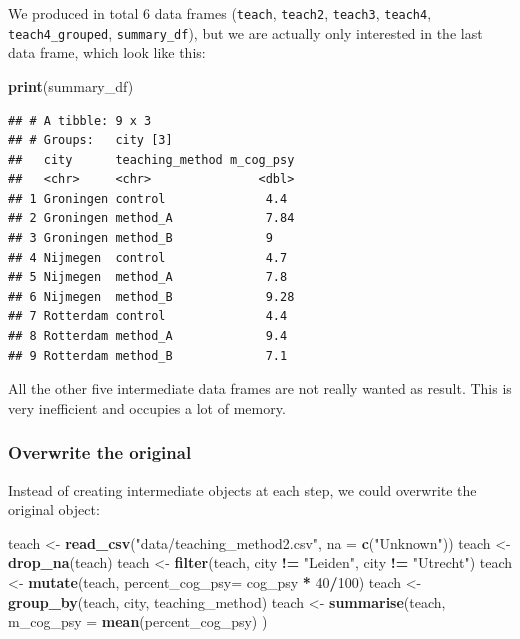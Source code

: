 \documentclass[
]{scrartcl}
\newenvironment{Shaded}{\begin{snugshade}}{\end{snugshade}}
\newcommand{\AttributeTok}[1]{\textcolor[rgb]{0.13,0.29,0.53}{#1}}
\newcommand{\DecValTok}[1]{\textcolor[rgb]{0.00,0.00,0.81}{#1}}
\newcommand{\FunctionTok}[1]{\textcolor[rgb]{0.13,0.29,0.53}{\textbf{#1}}}
\newcommand{\NormalTok}[1]{#1}
\newcommand{\OtherTok}[1]{\textcolor[rgb]{0.56,0.35,0.01}{#1}}
\newcommand{\SpecialCharTok}[1]{\textcolor[rgb]{0.81,0.36,0.00}{\textbf{#1}}}
\newcommand{\StringTok}[1]{\textcolor[rgb]{0.31,0.60,0.02}{#1}}
\begin{document}
We produced in total 6 data frames (\texttt{teach}, \texttt{teach2}, \texttt{teach3}, \texttt{teach4}, \texttt{teach4\_grouped}, \texttt{summary\_df}), but we are actually only interested in the last data frame, which look like this:

\begin{Shaded}
\begin{Highlighting}[]
\FunctionTok{print}\NormalTok{(summary\_df)}
\end{Highlighting}
\end{Shaded}

\begin{verbatim}
## # A tibble: 9 x 3
## # Groups:   city [3]
##   city      teaching_method m_cog_psy
##   <chr>     <chr>               <dbl>
## 1 Groningen control              4.4 
## 2 Groningen method_A             7.84
## 3 Groningen method_B             9   
## 4 Nijmegen  control              4.7 
## 5 Nijmegen  method_A             7.8 
## 6 Nijmegen  method_B             9.28
## 7 Rotterdam control              4.4 
## 8 Rotterdam method_A             9.4 
## 9 Rotterdam method_B             7.1
\end{verbatim}

All the other five intermediate data frames are not really wanted as result. This is very inefficient and occupies a lot of memory.

\hypertarget{overwrite-the-original}{%
\subsubsection{Overwrite the original}\label{overwrite-the-original}}

Instead of creating intermediate objects at each step, we could overwrite the original object:

\begin{Shaded}
\begin{Highlighting}[]
\NormalTok{teach }\OtherTok{\textless{}{-}} \FunctionTok{read\_csv}\NormalTok{(}\StringTok{"data/teaching\_method2.csv"}\NormalTok{, }\AttributeTok{na =} \FunctionTok{c}\NormalTok{(}\StringTok{"Unknown"}\NormalTok{))}
\NormalTok{teach }\OtherTok{\textless{}{-}} \FunctionTok{drop\_na}\NormalTok{(teach)}
\NormalTok{teach }\OtherTok{\textless{}{-}} \FunctionTok{filter}\NormalTok{(teach, city }\SpecialCharTok{!=} \StringTok{"Leiden"}\NormalTok{, city }\SpecialCharTok{!=} \StringTok{"Utrecht"}\NormalTok{)}
\NormalTok{teach }\OtherTok{\textless{}{-}} \FunctionTok{mutate}\NormalTok{(teach, }\AttributeTok{percent\_cog\_psy=}\NormalTok{ cog\_psy }\SpecialCharTok{*} \DecValTok{40}\SpecialCharTok{/}\DecValTok{100}\NormalTok{)}
\NormalTok{teach }\OtherTok{\textless{}{-}} \FunctionTok{group\_by}\NormalTok{(teach, city, teaching\_method)}
\NormalTok{teach }\OtherTok{\textless{}{-}} \FunctionTok{summarise}\NormalTok{(teach, }\AttributeTok{m\_cog\_psy =} \FunctionTok{mean}\NormalTok{(percent\_cog\_psy) )}
\end{Highlighting}
\end{Shaded}
\end{document}
